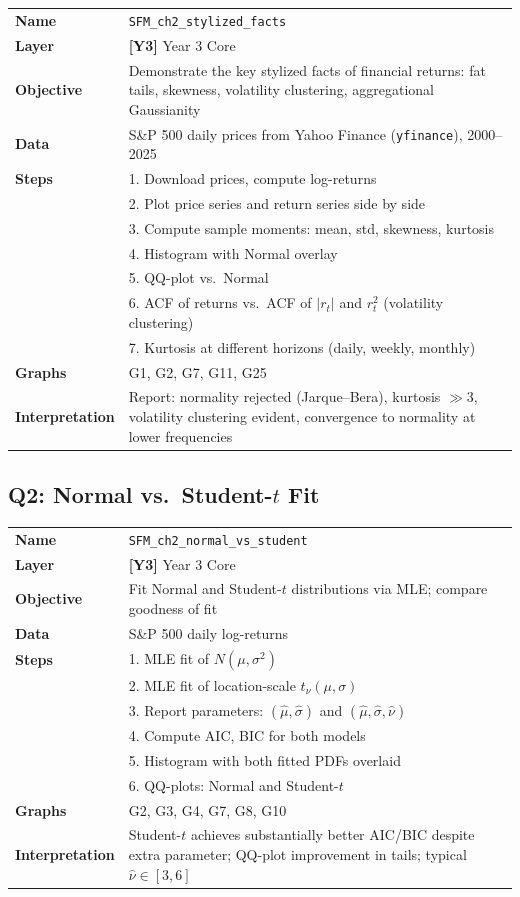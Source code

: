 \documentclass[11pt, a4paper]{article}
\newcommand{\layerY}[1]{\textcolor{MainBlue}{\textbf{[Y3]}} #1}
\theoremstyle{definition}
\begin{document}
\begin{tabular}{l p{12cm}}
\toprule
\textbf{Name} & \texttt{SFM\_ch2\_stylized\_facts} \\
\textbf{Layer} & \layerY{Year 3 Core} \\
\textbf{Objective} & Demonstrate the key stylized facts of financial returns: fat tails, skewness, volatility clustering, aggregational Gaussianity \\
\textbf{Data} & S\&P 500 daily prices from Yahoo Finance (\texttt{yfinance}), 2000--2025 \\
\textbf{Steps} &
  1. Download prices, compute log-returns \\
  & 2. Plot price series and return series side by side \\
  & 3. Compute sample moments: mean, std, skewness, kurtosis \\
  & 4. Histogram with Normal overlay \\
  & 5. QQ-plot vs.\ Normal \\
  & 6. ACF of returns vs.\ ACF of $|r_t|$ and $r_t^2$ (volatility clustering) \\
  & 7. Kurtosis at different horizons (daily, weekly, monthly) \\
\textbf{Graphs} & G1, G2, G7, G11, G25 \\
\textbf{Interpretation} & Report: normality rejected (Jarque--Bera), kurtosis $\gg 3$, volatility clustering evident, convergence to normality at lower frequencies \\
\bottomrule
\end{tabular}

\subsection{Q2: Normal vs.\ Student-$t$ Fit}

\begin{tabular}{l p{12cm}}
\toprule
\textbf{Name} & \texttt{SFM\_ch2\_normal\_vs\_student} \\
\textbf{Layer} & \layerY{Year 3 Core} \\
\textbf{Objective} & Fit Normal and Student-$t$ distributions via MLE; compare goodness of fit \\
\textbf{Data} & S\&P 500 daily log-returns \\
\textbf{Steps} &
  1. MLE fit of $N(\mu, \sigma^2)$ \\
  & 2. MLE fit of location-scale $t_\nu(\mu, \sigma)$ \\
  & 3. Report parameters: $(\hat{\mu}, \hat{\sigma})$ and $(\hat{\mu}, \hat{\sigma}, \hat{\nu})$ \\
  & 4. Compute AIC, BIC for both models \\
  & 5. Histogram with both fitted PDFs overlaid \\
  & 6. QQ-plots: Normal and Student-$t$ \\
\textbf{Graphs} & G2, G3, G4, G7, G8, G10 \\
\textbf{Interpretation} & Student-$t$ achieves substantially better AIC/BIC despite extra parameter; QQ-plot improvement in tails; typical $\hat{\nu} \in [3, 6]$ \\
\bottomrule
\end{tabular}
\end{document}

